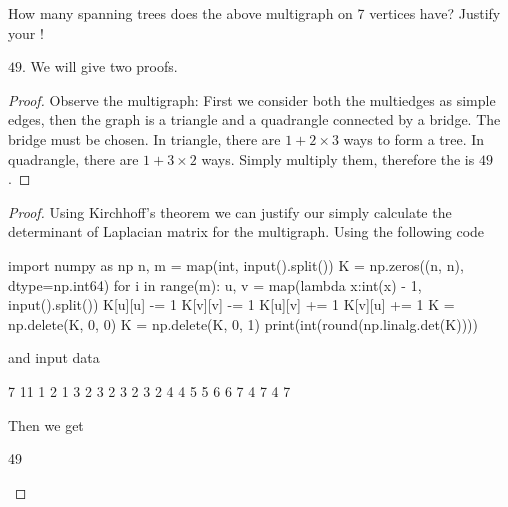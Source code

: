 \documentclass[11pt,a4paper,oneside]{article}
\begin{document}
\begin{problem}{4}
\statement
How many spanning trees does the above multigraph on 7 vertices have?
Justify your !

\solution

$49$. We will give two proofs.
\begin{proof}
Observe the multigraph: First we consider both the multiedges as simple edges, then the graph is a triangle and a quadrangle connected by a bridge. The bridge must be chosen. In triangle, there are $1 + 2 \times 3$ ways to form a tree. In quadrangle, there are $1 + 3 \times 2$ ways. Simply multiply them, therefore the  is $49$.
\end{proof}
\begin{proof}
Using Kirchhoff's theorem we can justify our  simply calculate the determinant of Laplacian matrix for the multigraph. Using the following code
\begin{python}
import numpy as np
n, m = map(int, input().split())
K = np.zeros((n, n), dtype=np.int64)
for i in range(m):
	u, v = map(lambda x:int(x) - 1, input().split())
	K[u][u] -= 1
	K[v][v] -= 1
	K[u][v] += 1
	K[v][u] += 1
K = np.delete(K, 0, 0)
K = np.delete(K, 0, 1)
print(int(round(np.linalg.det(K))))
\end{python}
and input data
\begin{python}
7 11
1 2
1 3
2 3
2 3
2 3
2 4
4 5
5 6
6 7
4 7
4 7
\end{python}
Then we get 
\begin{python}
49
\end{python}
\end{proof}
\end{problem}
\end{document}
